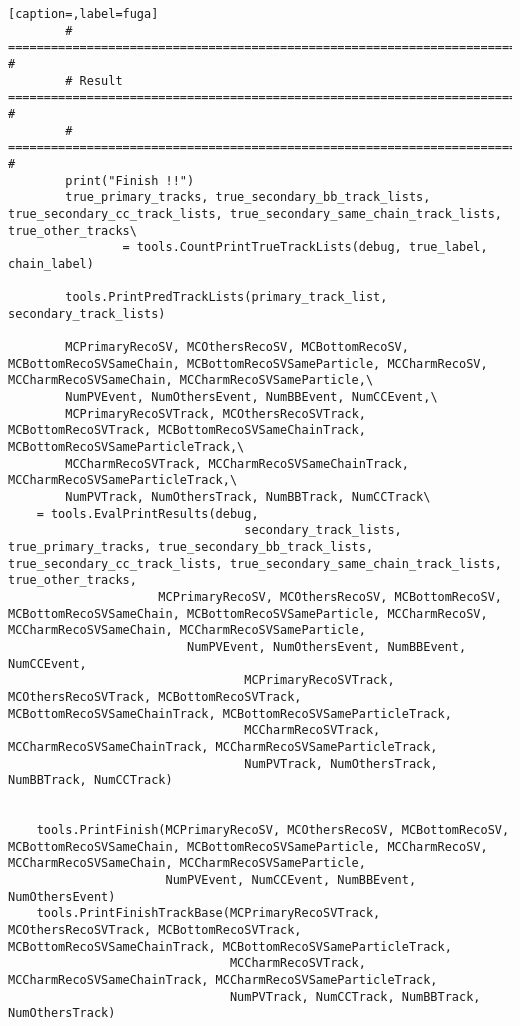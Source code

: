 \begin{lstlisting}[caption=,label=fuga]
        # ================================================================================================= #
        # Result ========================================================================================== #
        # ================================================================================================= #
        print("Finish !!")
        true_primary_tracks, true_secondary_bb_track_lists, true_secondary_cc_track_lists, true_secondary_same_chain_track_lists, true_other_tracks\
                = tools.CountPrintTrueTrackLists(debug, true_label, chain_label)
        
        tools.PrintPredTrackLists(primary_track_list, secondary_track_lists)

        MCPrimaryRecoSV, MCOthersRecoSV, MCBottomRecoSV, MCBottomRecoSVSameChain, MCBottomRecoSVSameParticle, MCCharmRecoSV, MCCharmRecoSVSameChain, MCCharmRecoSVSameParticle,\
        NumPVEvent, NumOthersEvent, NumBBEvent, NumCCEvent,\
        MCPrimaryRecoSVTrack, MCOthersRecoSVTrack, MCBottomRecoSVTrack, MCBottomRecoSVSameChainTrack, MCBottomRecoSVSameParticleTrack,\
        MCCharmRecoSVTrack, MCCharmRecoSVSameChainTrack, MCCharmRecoSVSameParticleTrack,\
        NumPVTrack, NumOthersTrack, NumBBTrack, NumCCTrack\
	= tools.EvalPrintResults(debug, 
                                 secondary_track_lists, true_primary_tracks, true_secondary_bb_track_lists, true_secondary_cc_track_lists, true_secondary_same_chain_track_lists, true_other_tracks, 
			         MCPrimaryRecoSV, MCOthersRecoSV, MCBottomRecoSV, MCBottomRecoSVSameChain, MCBottomRecoSVSameParticle, MCCharmRecoSV, MCCharmRecoSVSameChain, MCCharmRecoSVSameParticle,
		                 NumPVEvent, NumOthersEvent, NumBBEvent, NumCCEvent,
                                 MCPrimaryRecoSVTrack, MCOthersRecoSVTrack, MCBottomRecoSVTrack, MCBottomRecoSVSameChainTrack, MCBottomRecoSVSameParticleTrack,
                                 MCCharmRecoSVTrack, MCCharmRecoSVSameChainTrack, MCCharmRecoSVSameParticleTrack,
                                 NumPVTrack, NumOthersTrack, NumBBTrack, NumCCTrack)


    tools.PrintFinish(MCPrimaryRecoSV, MCOthersRecoSV, MCBottomRecoSV, MCBottomRecoSVSameChain, MCBottomRecoSVSameParticle, MCCharmRecoSV, MCCharmRecoSVSameChain, MCCharmRecoSVSameParticle,
                      NumPVEvent, NumCCEvent, NumBBEvent, NumOthersEvent)
    tools.PrintFinishTrackBase(MCPrimaryRecoSVTrack, MCOthersRecoSVTrack, MCBottomRecoSVTrack, MCBottomRecoSVSameChainTrack, MCBottomRecoSVSameParticleTrack, 
                               MCCharmRecoSVTrack, MCCharmRecoSVSameChainTrack, MCCharmRecoSVSameParticleTrack,
                               NumPVTrack, NumCCTrack, NumBBTrack, NumOthersTrack)
\end{lstlisting}
    
    
    
    
    
    
    
    
    
    
    
    
    
    